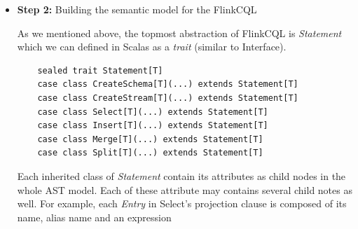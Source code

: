 \begin{itemize}
The topmost abstraction of the FlinkCQL grammar is \textit{Statement}. It can express either \textit{Select}, \textit{Create schema}, \textit{Create stream}, \textit{Merge}, \textit{Insert}, \textit{Split} query syntax.
\begin{lstlisting}
lazy val stmt = (selectStmtSyntax| createSchemaStmtSyntax | createStreamStmtSyntax | MergeStmtSyntax  | insertStmtSyntax| splitStmtSyntax)
\end{lstlisting}

The parsing process of the grammar will generate a parse tree but the ouput tree is represented by a string. Let us consider the parse tree of the sample query:
\begin{lstlisting}
((List(((((s~.)~Quantity),*,Price)~None),(((StockTick~.)~Symbol)~None))~(((StockTick~None)~Some(s))~None))~None)~None
\end{lstlisting}
The List denote that the query require 2 entries in projection clause. The last 2 \textit{None} values express that \textit{Where} clause and \textit{GroupBy} clause is missing.

However, this output format is useless for next steps since it is also a string in a different way. Thus, we need to design a more powerful abstract semantic model and integrate it to the parser tree so that the parser will return a \textbf{Statement} object , instead of a string. Once we obtain a \textbf{Statement} object, we are able to exploit its components recursively for further traversal. As long as we build a complete semantic model for FlinkCQL (in Step 2), Scala offers a bunch of function application combinators to plug directly these semantic abstractions to the parse rules (in Step 3)

\item \textbf{Step 2:} Building the semantic model for the FlinkCQL

As we mentioned above, the topmost abstraction of FlinkCQL is \textit{Statement} which we can defined in Scalas as a \textit{trait} (similar to Interface).
\begin{lstlisting}
	sealed trait Statement[T]
	case class CreateSchema[T](...) extends Statement[T]
	case class CreateStream[T](...) extends Statement[T]
	case class Select[T](...) extends Statement[T]
	case class Insert[T](...) extends Statement[T]
	case class Merge[T](...) extends Statement[T]
	case class Split[T](...) extends Statement[T]
\end{lstlisting}

Each inherited class of \textit{Statement} contain its attributes as child nodes in the whole AST model. Each of these attribute may contains several child notes as well. For example, each \textit{Entry} in Select's projection clause is composed of its name, alias name and an expression


\end{itemize}
